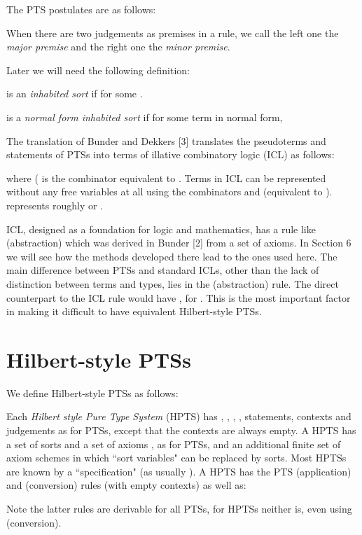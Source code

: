 \documentclass{LMCS}
\begin{document}
  The PTS postulates are as follows:
\smallskip
{\small}\smallskip

  \noindent When there are two judgements as premises in a rule, we call the
  left one the \emph{major premise} and the right one the \emph{minor
    premise}.

  Later we will need the following definition:

\begin{defi}\hfill

   is an \emph{inhabited sort}  if 
  for some .

   is a \emph{normal form inhabited sort}  if
  for some term  in normal form, 
\end{defi}

  The translation  of Bunder and Dekkers [3]
  translates the pseudoterms and statements of PTSs into terms
  of illative combinatory logic (ICL) as follows:


  where  ( is the
  combinator equivalent to . Terms in ICL can be
  represented without any free variables at all using the combinators
   and  (equivalent to ). 
  represents roughly  or .

  ICL, designed as a foundation for logic and mathematics, has a rule
  like (abstraction) which was derived in Bunder [2] from a set of
  axioms. In Section 6 we will see how the methods developed there
  lead to the ones used here. The main difference between PTSs and
  standard ICLs, other than the lack of distinction between terms and
  types, lies in the (abstraction) rule. The direct counterpart to the
  ICL rule would have , for .  This is the most important factor in making it
  difficult to have equivalent Hilbert-style PTSs.

\section{Hilbert-style PTSs}\label{S:HSPTS}

 \noindent We define Hilbert-style PTSs as follows:

\begin{defi}[HPTS]

  Each \emph{Hilbert style Pure Type System} (HPTS) has , , , , statements, contexts and judgements
  as for PTSs, except that the contexts are always empty. A HPTS has a
  set of sorts  and a set of axioms , as for
  PTSs, and an additional finite set  of axiom schemes
  in which ``sort variables" can be replaced by sorts.  Most HPTSs are
  known by a ``specification" 
  (as usually ). A HPTS has the PTS
  (application) and (conversion) rules (with empty contexts) as well
  as:
\bigskip
{\small}
\end{defi}
  Note the latter rules are derivable for all PTSs, for HPTSs neither
  is, even using (conversion).
\end{document}
